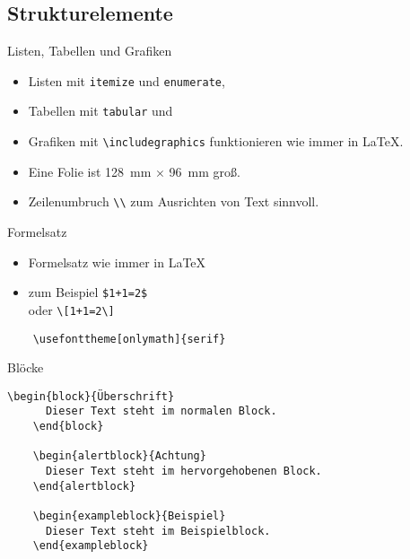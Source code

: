\subsection{Strukturelemente}

\begin{Frame}[fragile]{Listen, Tabellen und Grafiken}
  \begin{itemize}
    \item Listen mit \lstinline-itemize- und \lstinline-enumerate-,
    \item Tabellen mit \lstinline-tabular- und
    \item Grafiken mit \lstinline-\includegraphics- funktionieren wie immer in \LaTeX.
  \end{itemize}

  \xxx

  \begin{itemize}
    \item Eine Folie ist 128~mm $\times$ 96~mm groß.
    \item Zeilenumbruch \lstinline-\\- zum Ausrichten von Text sinnvoll.
  \end{itemize}
\end{Frame}

\begin{Frame}[fragile]{Formelsatz}
  \begin{itemize}
    \item Formelsatz wie immer in \LaTeX
    \item zum Beispiel \lstinline-$1+1=2$-\\
      oder \lstinline-\[1+1=2\]-
  \end{itemize}

  \xxx

  \begin{lstlisting}[gobble=4]
    % Formeln mit Serifen setzen
    \usefonttheme[onlymath]{serif}
  \end{lstlisting}
\end{Frame}

\begin{Frame}[fragile]{Blöcke}
  \begin{lstlisting}[gobble=4]
    \begin{block}{Überschrift}
      Dieser Text steht im normalen Block.
    \end{block}

    \begin{alertblock}{Achtung}
      Dieser Text steht im hervorgehobenen Block.
    \end{alertblock}

    \begin{exampleblock}{Beispiel}
      Dieser Text steht im Beispielblock.
    \end{exampleblock}
  \end{lstlisting}
\end{Frame}

